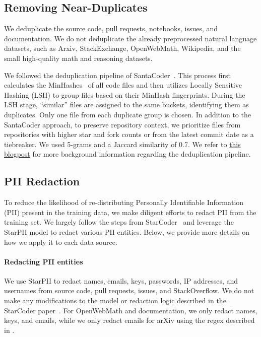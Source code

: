 \documentclass[10pt]{article} %
\begin{document}
\subsection{Removing Near-Duplicates}\label{sec:deduplication}
We deduplicate the source code, pull requests, notebooks, issues, and documentation. We do not deduplicate the already preprocessed natural language datasets, such as Arxiv, StackExchange, OpenWebMath, Wikipedia, and the small high-quality math and reasoning datasets. 

We followed the deduplication pipeline of SantaCoder~\citep{allal2023santacoder}. This process first calculates the MinHashes~\citep{broder2000identifying} of all code files and then utilizes Locally Sensitive Hashing (LSH) to group files based on their MinHash fingerprints. During the LSH stage, ``similar'' files are assigned to the same buckets, identifying them as duplicates. Only one file from each duplicate group is chosen. In addition to the SantaCoder approach, to preserve repository context, we prioritize files from repositories with higher star and fork counts or from the latest commit date as a tiebreaker. We used 5-grams and a Jaccard similarity of 0.7. We refer to  \href{https://chenghaomou.github.io/posts/20230220150602}{this blogpost} for more background information regarding the deduplication pipeline. 


\subsection{PII Redaction}\label{sec:pii_redaction}
To reduce the likelihood of re-distributing Personally Identifiable Information (PII) present in the training data, we make diligent efforts to redact PII from the training set. We largely follow the steps from StarCoder~\citep{li2023starcoder} and leverage the StarPII model to redact various PII entities. Below, we provide more details on how we apply it to each data source. 

\paragraph{Redacting PII entities} We use StarPII to redact names, emails, keys, passwords, IP addresses, and usernames from source code, pull requests, issues, and StackOverflow. We do not make any modifications to the model or redaction logic described in the StarCoder paper~\citep{li2023starcoder}. For OpenWebMath and documentation, we only redact names, keys, and emails, while we only redact emails for arXiv using the regex described in \citet{allal2023santacoder}. 
\end{document}
